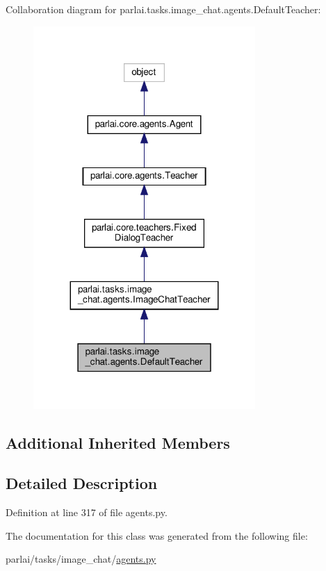 Collaboration diagram for parlai.\+tasks.\+image\+\_\+chat.\+agents.\+Default\+Teacher\+:\nopagebreak
\begin{figure}[H]
\begin{center}
\leavevmode
\includegraphics[width=239pt]{d4/d75/classparlai_1_1tasks_1_1image__chat_1_1agents_1_1DefaultTeacher__coll__graph}
\end{center}
\end{figure}
\subsection*{Additional Inherited Members}


\subsection{Detailed Description}


Definition at line 317 of file agents.\+py.



The documentation for this class was generated from the following file\+:\begin{DoxyCompactItemize}
\item 
parlai/tasks/image\+\_\+chat/\hyperlink{parlai_2tasks_2image__chat_2agents_8py}{agents.\+py}\end{DoxyCompactItemize}
